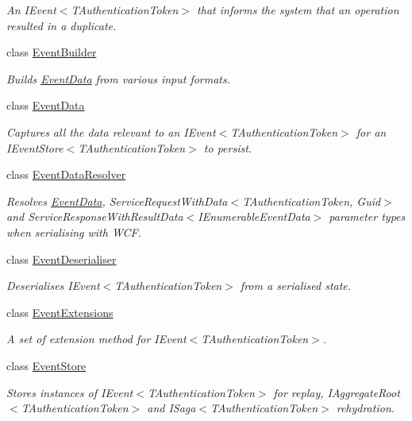 \begin{DoxyCompactItemize}
\begin{DoxyCompactList}\small\item\em An I\+Event$<$\+T\+Authentication\+Token$>$ that informs the system that an operation resulted in a duplicate. \end{DoxyCompactList}\item 
class \hyperlink{classCqrs_1_1Events_1_1EventBuilder}{Event\+Builder}
\begin{DoxyCompactList}\small\item\em Builds \hyperlink{classCqrs_1_1Events_1_1EventData}{Event\+Data} from various input formats. \end{DoxyCompactList}\item 
class \hyperlink{classCqrs_1_1Events_1_1EventData}{Event\+Data}
\begin{DoxyCompactList}\small\item\em Captures all the data relevant to an I\+Event$<$\+T\+Authentication\+Token$>$ for an I\+Event\+Store$<$\+T\+Authentication\+Token$>$ to persist. \end{DoxyCompactList}\item 
class \hyperlink{classCqrs_1_1Events_1_1EventDataResolver}{Event\+Data\+Resolver}
\begin{DoxyCompactList}\small\item\em Resolves \hyperlink{classCqrs_1_1Events_1_1EventData}{Event\+Data}, Service\+Request\+With\+Data$<$\+T\+Authentication\+Token, Guid$>$ and Service\+Response\+With\+Result\+Data$<$\+I\+Enumerable\+Event\+Data$>$ parameter types when serialising with W\+CF. \end{DoxyCompactList}\item 
class \hyperlink{classCqrs_1_1Events_1_1EventDeserialiser}{Event\+Deserialiser}
\begin{DoxyCompactList}\small\item\em Deserialises I\+Event$<$\+T\+Authentication\+Token$>$ from a serialised state. \end{DoxyCompactList}\item 
class \hyperlink{classCqrs_1_1Events_1_1EventExtensions}{Event\+Extensions}
\begin{DoxyCompactList}\small\item\em A set of extension method for I\+Event$<$\+T\+Authentication\+Token$>$. \end{DoxyCompactList}\item 
class \hyperlink{classCqrs_1_1Events_1_1EventStore}{Event\+Store}
\begin{DoxyCompactList}\small\item\em Stores instances of I\+Event$<$\+T\+Authentication\+Token$>$ for replay, I\+Aggregate\+Root$<$\+T\+Authentication\+Token$>$ and I\+Saga$<$\+T\+Authentication\+Token$>$ rehydration. \end{DoxyCompactList}\item 

\end{DoxyCompactItemize}
